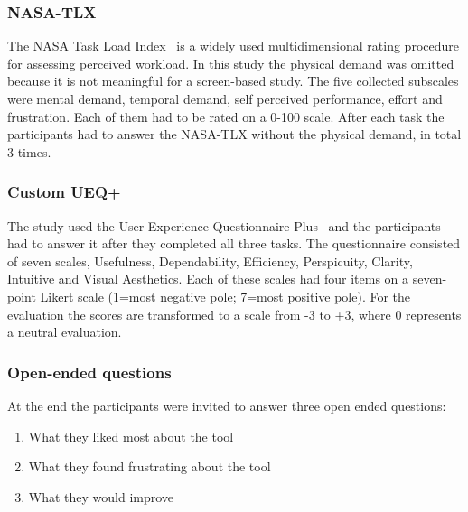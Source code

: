 \subsubsection{NASA-TLX}
The NASA Task Load Index~\cite{hart1988nasa} is a widely used multidimensional rating procedure for assessing perceived workload. In this study the physical demand was omitted because it is not meaningful for a screen-based study. The five collected subscales were mental demand, temporal demand, self perceived performance, effort and frustration. Each of them had to be rated on a 0-100 scale. After each task the participants had to answer the NASA-TLX without the physical demand, in total 3 times.
\subsubsection{Custom UEQ+}  
The study used the User Experience Questionnaire Plus~\cite{Schrepp_Thomaschewski_2019} and the participants had to answer it after they completed all three tasks. The questionnaire consisted of seven scales, Usefulness, Dependability, Efficiency, Perspicuity, Clarity, Intuitive and Visual Aesthetics. Each of these scales had four items on a seven-point Likert scale (1=most negative pole; 7=most positive pole). For the evaluation the scores are transformed to a scale from -3 to +3, where 0 represents a neutral evaluation.
\subsubsection{Open-ended questions}
At the end the participants were invited to answer three open ended questions:
\begin{enumerate}
    \item What they liked most about the tool
    \item What they found frustrating about the tool
    \item What they would improve
\end{enumerate}